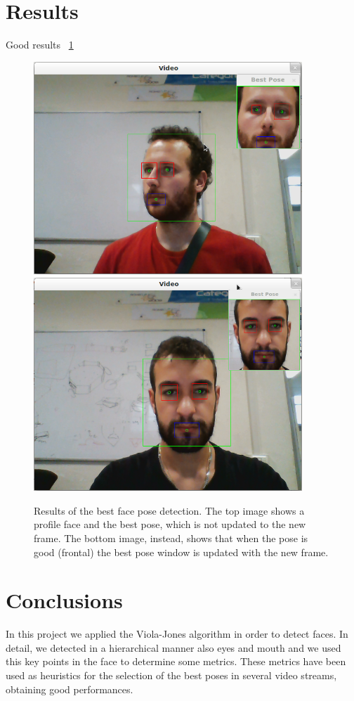 \documentclass[10pt,a4paper]{report}
\begin{document}
\section*{Results}
Good results \figurename~\ref{fig:best_pose}
\begin{figure}
\centering
\includegraphics[width=0.9\textwidth]{./best_face_jacopo.png}
\includegraphics[width=0.9\textwidth]{./best_face_rob.png}
\caption{Results of the best face pose detection. The top image shows a profile face and the best pose, which is not updated to the new frame. The bottom image, instead, shows that when the pose is good (frontal) the best pose window is updated with the new frame.}
\label{fig:best_pose}
\end{figure}
\section*{Conclusions}
In this project we applied the Viola-Jones algorithm in order to detect faces. In detail, we detected in a hierarchical manner also eyes and mouth and we used this key points in the face to determine some metrics. These metrics have been used as heuristics for the selection of the best poses in several video streams, obtaining good performances.
\end{document}
